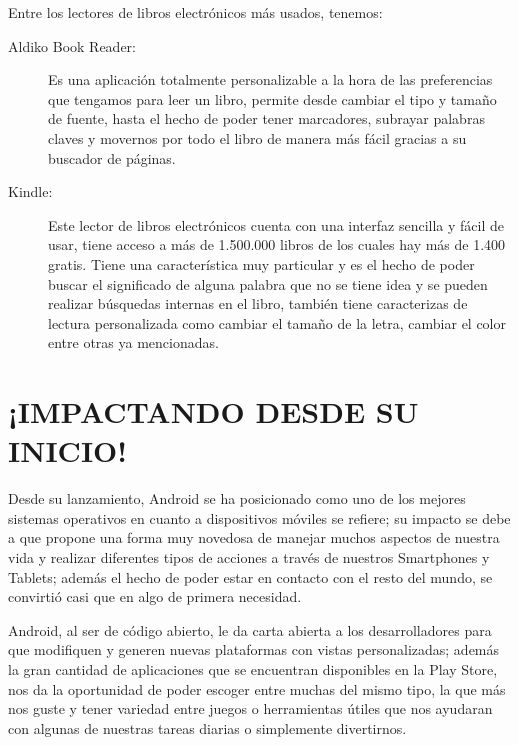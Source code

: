 Entre los lectores de libros electrónicos más usados, tenemos:
\begin{description}
	\item[Aldiko Book Reader:]
		Es una aplicación totalmente personalizable a la hora de las preferencias que tengamos para leer un libro, permite desde cambiar el tipo y tamaño de fuente, hasta el hecho 
		de poder tener marcadores, subrayar palabras claves y movernos por todo el libro de manera más fácil gracias a su buscador de páginas.
		
	\item[Kindle:]
		Este lector de libros electrónicos cuenta con una interfaz sencilla y fácil de usar, tiene acceso a más de 1.500.000 libros de los cuales hay más de 1.400 gratis. Tiene una 
		característica muy particular y es el hecho de poder buscar el significado de alguna palabra que no se tiene idea y se pueden realizar búsquedas internas en el libro, 
		también tiene caracterizas de lectura personalizada como cambiar el tamaño de la letra, cambiar el color entre otras ya mencionadas.
\end{description}

\section*{¡IMPACTANDO DESDE SU INICIO!}
Desde su lanzamiento, Android se ha posicionado como uno de los mejores sistemas operativos en cuanto a dispositivos móviles se refiere; su impacto se debe a que propone una 
forma muy novedosa de manejar muchos aspectos de nuestra vida y realizar diferentes tipos de acciones a través de nuestros Smartphones y Tablets; además el hecho de poder estar 
en contacto con el resto del mundo, se convirtió casi que en algo de primera necesidad.
 
Android, al ser de código abierto, le da carta abierta a los desarrolladores para que modifiquen y generen nuevas plataformas con vistas personalizadas; además la gran cantidad 
de aplicaciones que se encuentran disponibles en la Play Store, nos da la oportunidad de poder escoger entre muchas del mismo tipo, la que más nos guste y tener variedad entre 
juegos o herramientas útiles que nos ayudaran con algunas de nuestras tareas diarias o simplemente divertirnos.
 
